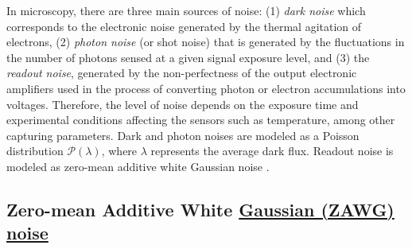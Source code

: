 \documentclass{article}
\begin{document}
In microscopy, there are three main sources of noise: (1) \emph{dark
  noise} which corresponds to the electronic noise generated by the
thermal agitation of electrons, (2) \emph{photon noise} (or shot
noise) that is generated by the fluctuations in the number of photons
sensed at a given signal exposure level, and (3) the \emph{readout
  noise}, generated by the non-perfectness of the output electronic
amplifiers used in the process of converting photon or electron
accumulations into voltages. Therefore, the level of noise depends on
the exposure time and experimental conditions affecting the sensors
such as temperature, among other capturing parameters. Dark and photon
noises are modeled as a Poisson distribution $\mathcal{P}(\lambda)$,
where $\lambda$ represents the average dark flux. Readout noise is
modeled as zero-mean additive white Gaussian noise
\cite{meiniel2018denoising,zhou2020wirtinger}.

\subsection{Zero-mean Additive White \href{https://en.wikipedia.org/wiki/Gaussian_noise}{Gaussian (ZAWG) noise}}
\end{document}
